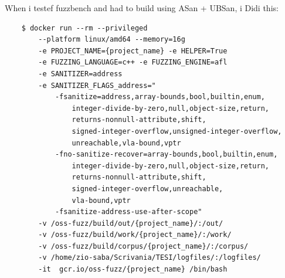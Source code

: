 \newpage
When i testef fuzzbench and had to build using ASan + UBSan, i Didi this:
\begin{verbatim}
    $ docker run --rm --privileged 
        --platform linux/amd64 --memory=16g 
        -e PROJECT_NAME={project_name} -e HELPER=True 
        -e FUZZING_LANGUAGE=c++ -e FUZZING_ENGINE=afl 
        -e SANITIZER=address 
        -e SANITIZER_FLAGS_address="
            -fsanitize=address,array-bounds,bool,builtin,enum,
                integer-divide-by-zero,null,object-size,return,
                returns-nonnull-attribute,shift,
                signed-integer-overflow,unsigned-integer-overflow,
                unreachable,vla-bound,vptr
            -fno-sanitize-recover=array-bounds,bool,builtin,enum,
                integer-divide-by-zero,null,object-size,return,
                returns-nonnull-attribute,shift,
                signed-integer-overflow,unreachable,
                vla-bound,vptr 
            -fsanitize-address-use-after-scope" 
        -v /oss-fuzz/build/out/{project_name}/:/out/  
        -v /oss-fuzz/build/work/{project_name}/:/work/
        -v /oss-fuzz/build/corpus/{project_name}/:/corpus/
        -v /home/zio-saba/Scrivania/TESI/logfiles/:/logfiles/  
        -it  gcr.io/oss-fuzz/{project_name} /bin/bash
\end{verbatim}

